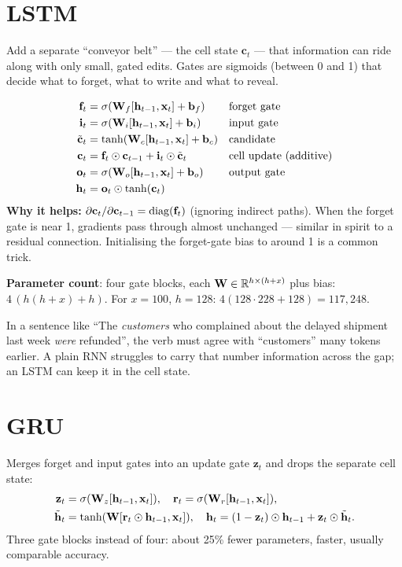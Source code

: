 \section{LSTM}
\begin{intuition}
Add a separate ``conveyor belt'' --- the cell state $\mathbf{c}_t$ --- that information can ride along with only small, gated edits. Gates are sigmoids (between 0 and 1) that decide what to forget, what to write and what to reveal.
\end{intuition}
\begin{align*}
\mathbf{f}_t&=\sigma(\mathbf{W}_f[\mathbf{h}_{t-1},\mathbf{x}_t]+\mathbf{b}_f) &&\text{forget gate}\\
\mathbf{i}_t&=\sigma(\mathbf{W}_i[\mathbf{h}_{t-1},\mathbf{x}_t]+\mathbf{b}_i) &&\text{input gate}\\
\tilde{\mathbf{c}}_t&=\tanh(\mathbf{W}_c[\mathbf{h}_{t-1},\mathbf{x}_t]+\mathbf{b}_c) &&\text{candidate}\\
\mathbf{c}_t&=\mathbf{f}_t\odot\mathbf{c}_{t-1}+\mathbf{i}_t\odot\tilde{\mathbf{c}}_t &&\text{cell update (additive)}\\
\mathbf{o}_t&=\sigma(\mathbf{W}_o[\mathbf{h}_{t-1},\mathbf{x}_t]+\mathbf{b}_o) &&\text{output gate}\\
\mathbf{h}_t&=\mathbf{o}_t\odot\tanh(\mathbf{c}_t)
\end{align*}
\textbf{Why it helps:} $\partial\mathbf{c}_t/\partial\mathbf{c}_{t-1}=\operatorname{diag}(\mathbf{f}_t)$ (ignoring indirect paths). When the forget gate is near 1, gradients pass through almost unchanged --- similar in spirit to a residual connection. Initialising the forget-gate bias to around 1 is a common trick.

\textbf{Parameter count}: four gate blocks, each $\mathbf{W}\in\mathbb{R}^{h\times(h+x)}$ plus bias: $4\,(h(h+x)+h)$. For $x=100$, $h=128$: $4(128\cdot228+128)=117{,}248$.

\begin{realworld}
In a sentence like ``The \emph{customers} who complained about the delayed shipment last week \emph{were} refunded'', the verb must agree with ``customers'' many tokens earlier. A plain RNN struggles to carry that number information across the gap; an LSTM can keep it in the cell state.
\end{realworld}

\section{GRU}
Merges forget and input gates into an update gate $\mathbf{z}_t$ and drops the separate cell state:
\begin{align*}
\mathbf{z}_t&=\sigma(\mathbf{W}_z[\mathbf{h}_{t-1},\mathbf{x}_t]),\quad\mathbf{r}_t=\sigma(\mathbf{W}_r[\mathbf{h}_{t-1},\mathbf{x}_t]),\\
\tilde{\mathbf{h}}_t&=\tanh(\mathbf{W}[\mathbf{r}_t\odot\mathbf{h}_{t-1},\mathbf{x}_t]),\quad\mathbf{h}_t=(1-\mathbf{z}_t)\odot\mathbf{h}_{t-1}+\mathbf{z}_t\odot\tilde{\mathbf{h}}_t.
\end{align*}
Three gate blocks instead of four: about 25\% fewer parameters, faster, usually comparable accuracy.

